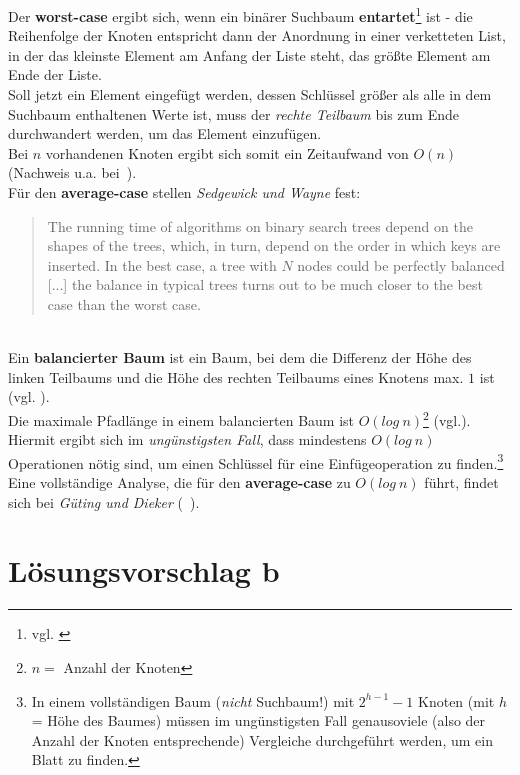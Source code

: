  \noindent
Der \textbf{worst-case} ergibt sich, wenn ein binärer Suchbaum \textbf{entartet}\footnote{
vgl. \cite[136]{GD18e}
} ist - die Reihenfolge der Knoten entspricht dann der Anordnung in einer verketteten List, in der das kleinste Element am Anfang der Liste steht, das größte Element am Ende der Liste.\\
Soll jetzt ein Element eingefügt werden, dessen Schlüssel größer als alle in dem Suchbaum enthaltenen Werte ist, muss der \textit{rechte Teilbaum} bis zum Ende durchwandert werden, um das Element einzufügen.\\
Bei $n$ vorhandenen Knoten ergibt sich somit ein Zeitaufwand von $O(n)$ (Nachweis u.a. bei~\cite[135 f.]{GD18d}).\\

\noindent
Für den \textbf{average-case} stellen \textit{Sedgewick und Wayne} fest:

\blockquote[{\cite[403]{SW11}}]{
The running time of algorithms on binary search trees depend on the shapes of the trees, which, in turn, depend on the order in which keys are inserted. In the best case, a tree with $N$ nodes could be perfectly balanced [...] the balance in typical trees turns out to be much closer to the best case than the worst case.
}\\

\noindent
Ein \textbf{balancierter Baum} ist ein Baum, bei dem die Differenz der Höhe des linken Teilbaums und die Höhe des rechten Teilbaums eines Knotens max. $1$ ist (vgl. \cite[284]{OW17e}).\\
Die maximale Pfadlänge in einem balancierten Baum ist $O(log\ n)$\footnote{$n=$ Anzahl der Knoten} (vgl.\cite[135]{GD18d}).\\
Hiermit ergibt sich im \textit{ungünstigsten Fall}, dass mindestens $O(log\ n)$ Operationen nötig sind, um einen Schlüssel für eine Einfügeoperation zu finden.\footnote{
In einem vollständigen Baum (\textit{nicht} Suchbaum!) mit $2^{h-1} - 1$ Knoten (mit $h$ = Höhe des Baumes) müssen im ungünstigsten Fall genausoviele (also der Anzahl der Knoten entsprechende) Vergleiche durchgeführt werden, um ein Blatt zu finden.
}\\
Eine vollständige Analyse, die für den \textbf{average-case} zu $O(log\ n)$ führt, findet sich bei \textit{Güting und Dieker} (~\cite[136 ff.]{GD18d}).




\section{Lösungsvorschlag b}

